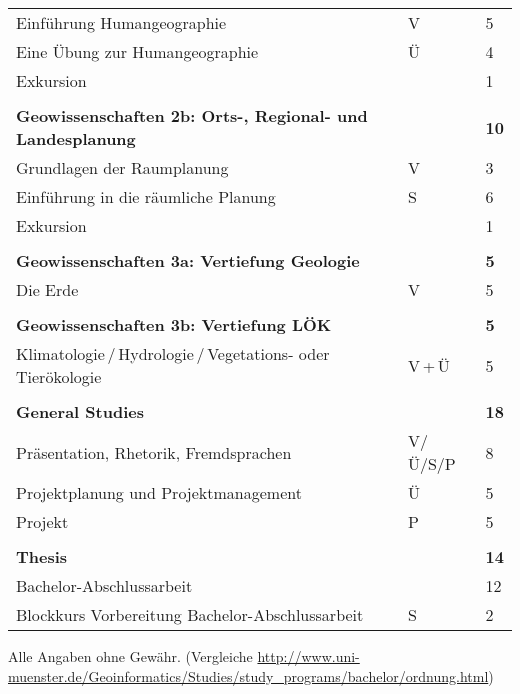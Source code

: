 \begin{longtable}{p{} p{} p{}}
Einführung Humangeographie & V & 5\\
Eine Übung zur Humangeographie & Ü & 4\\
Exkursion & & 1\\
&&\\
\textbf{Geowissenschaften 2b: Orts-, Regional- und Landesplanung} & & \textbf{10}\\
Grundlagen der Raumplanung & V & 3\\
Einführung in die räumliche Planung & S & 6\\
Exkursion & & 1\\
&&\\
\textbf{Geowissenschaften 3a: Vertiefung Geologie} & & \textbf{5}\\
Die Erde & V & 5\\
&&\\
\textbf{Geowissenschaften 3b: Vertiefung LÖK} & & \textbf{5}\\
Klimatologie\,/\,Hydrologie\,/\,Vegetations- oder Tierökologie& V\,+\,Ü & 5\\
&&\\
\textbf{General Studies} & & \textbf{18}\\
Präsentation, Rhetorik, Fremdsprachen & V/Ü/S/P & 8\\
Projektplanung und Projektmanagement & Ü & 5\\
Projekt & P & 5\\
&&\\
\textbf{Thesis} & & \textbf{14}\\
Bachelor-Abschlussarbeit & & 12\\
Blockkurs Vorbereitung Bachelor-Abschlussarbeit & S & 2\\

\end{longtable}

Alle Angaben ohne Gewähr. (Vergleiche \url{http://www.uni-muenster.de/Geoinformatics/Studies/study_programs/bachelor/ordnung.html})

\newpage

